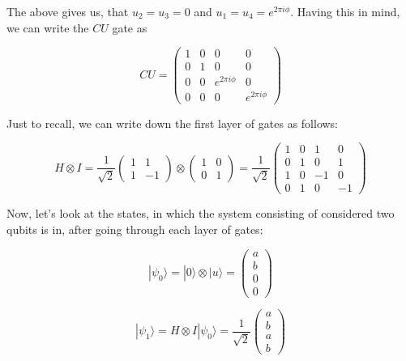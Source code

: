 The above gives us, that $u_2 = u_3 = 0$ and $u_1 = u_4 = e^{2 \pi i \phi}$. Having this in mind, we can write the $CU$ gate as

\[ CU = \begin{pmatrix} 
1 & 0 & 0 & 0 \\
0 & 1 & 0 & 0 \\
0 & 0 & e^{2 \pi i \phi} & 0 \\
0 & 0 & 0 & e^{2 \pi i \phi}
\end{pmatrix}\]

Just to recall, we can write down the first layer of gates as follows:

\[ H \otimes I = \frac{1}{\sqrt{2}} \begin{pmatrix} 1 & 1 \\ 1 & -1 \end{pmatrix} \otimes \begin{pmatrix} 1 & 0 \\ 0 & 1 \end{pmatrix} = \frac{1}{\sqrt{2}} \begin{pmatrix}
1 & 0 & 1 & 0 \\
0 & 1 & 0 & 1 \\
1 & 0 & -1 & 0 \\
0 & 1 & 0 & -1 \end{pmatrix}\]

Now, let's look at the states, in which the system consisting of considered two qubits is in, after going through each layer of gates:

\[ |\psi_0\rangle = |0\rangle \otimes |u\rangle = \begin{pmatrix} a \\ b \\ 0 \\ 0 \end{pmatrix} \]

\[ |\psi_1\rangle = H \otimes I|\psi_0\rangle = \frac{1}{\sqrt{2}} \begin{pmatrix} a \\ b \\ a \\ b \end{pmatrix} \]

